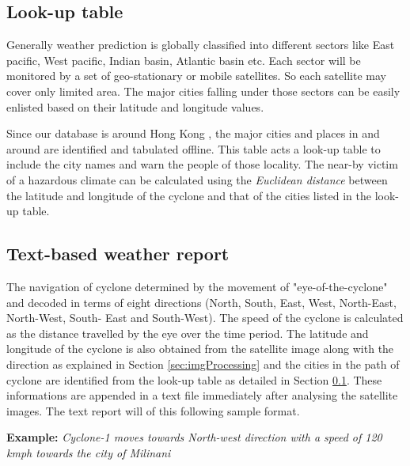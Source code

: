 \documentclass{article}
\begin{document}
\subsection{Look-up table}
\label{sec:lookupTable}

Generally weather prediction is globally classified into different sectors like East 
pacific, West pacific, Indian basin, Atlantic basin etc. Each sector will be monitored 
by a set of geo-stationary or mobile satellites. So each satellite may cover only 
limited area. The major cities falling under those sectors can be easily enlisted based 
on their latitude and longitude values. 

Since our database is around Hong Kong , the major 
cities and places in and around are identified and tabulated offline. This table acts a 
look-up table to include the city names and warn the people of those locality. The 
near-by victim of a hazardous climate can be calculated using the {\textit{Euclidean 
distance}} between the latitude and longitude of the cyclone and that of the cities 
listed in the look-up table.

\subsection{Text-based weather report}
\label{sec:textReport}

The navigation of cyclone determined by the movement of "eye-of-the-cyclone" and decoded 
in terms of eight directions (North, South, East, West, North-East, North-West, South-
East and South-West). The speed of the cyclone is calculated as the distance travelled by the eye over the time period. The latitude and longitude of the cyclone is also
obtained from the satellite image along with the direction as explained in Section \ref{sec:imgProcessing} and the cities in the path of cyclone are identified from the look-up table as detailed in Section \ref{sec:lookupTable}. These informations are appended in a text file immediately after analysing the satellite images. 
The text report will of this following sample format.

{\textbf{Example:} \textit{Cyclone-1 moves towards North-west direction with a speed of 120 kmph towards the city of Milinani}}
\end{document}
